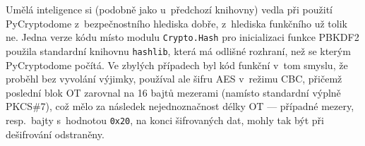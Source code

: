 Umělá inteligence si (podobně jako u~předchozí knihovny) vedla při použití PyCryptodome z~bez\-peč\-nost\-ní\-ho hlediska dobře, z~hlediska funkčního už tolik ne. Jedna verze kódu místo modulu \texttt{Crypto.Hash} pro inicializaci funkce PBKDF2 použila standardní knihovnu \texttt{hashlib}, která má odlišné rozhraní, než se kterým PyCryptodome počítá. Ve zbylých případech byl kód funkční v~tom smyslu, že proběhl bez vyvolání výjimky, používal ale šifru AES v~režimu CBC, přičemž poslední blok OT zarovnal na 16 bajtů mezerami (namísto standardní výplně PKCS\#7), což mělo za následek nejednoznačnost délky OT --- případné mezery, resp.\ bajty s~hodnotou \texttt{0x20}, na konci šifrovaných dat, mohly tak být při dešifrování odstraněny.
